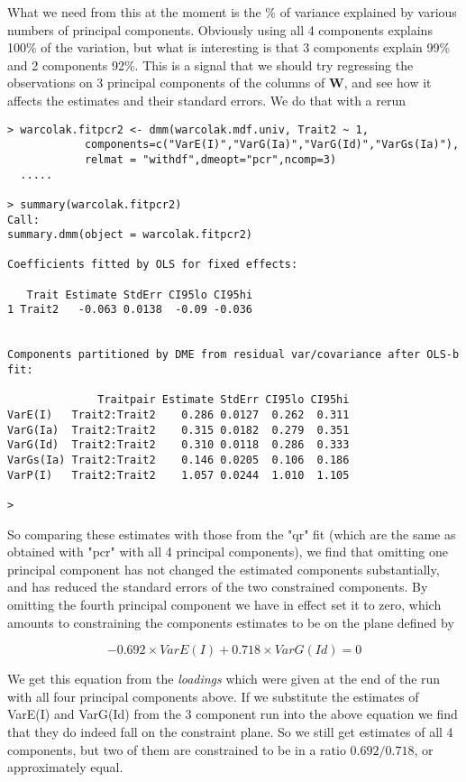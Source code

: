 \documentclass[titlepage]{article}  %
\begin{document}
What we need from this at the moment is the \% of variance explained by various numbers of principal components. Obviously using all 4 components explains 100\% of the variation, but what is interesting is that  3 components explain 99\% and 2 components 92\%. This is a signal that we should try regressing the observations on 3 principal components of the columns of $\bm{W}$, and see how it affects the estimates and their standard errors. We do that with a rerun

\begin{verbatim}
> warcolak.fitpcr2 <- dmm(warcolak.mdf.univ, Trait2 ~ 1,
            components=c("VarE(I)","VarG(Ia)","VarG(Id)","VarGs(Ia)"),
            relmat = "withdf",dmeopt="pcr",ncomp=3)
  .....

> summary(warcolak.fitpcr2)
Call:
summary.dmm(object = warcolak.fitpcr2)

Coefficients fitted by OLS for fixed effects:

   Trait Estimate StdErr CI95lo CI95hi
1 Trait2   -0.063 0.0138  -0.09 -0.036


Components partitioned by DME from residual var/covariance after OLS-b fit:

              Traitpair Estimate StdErr CI95lo CI95hi
VarE(I)   Trait2:Trait2    0.286 0.0127  0.262  0.311
VarG(Ia)  Trait2:Trait2    0.315 0.0182  0.279  0.351
VarG(Id)  Trait2:Trait2    0.310 0.0118  0.286  0.333
VarGs(Ia) Trait2:Trait2    0.146 0.0205  0.106  0.186
VarP(I)   Trait2:Trait2    1.057 0.0244  1.010  1.105

> 
\end{verbatim}

So comparing these estimates with those from the "qr" fit (which are the same as obtained with "pcr" with all 4 principal components), we find that omitting one principal component has not changed the estimated components substantially, and has reduced the standard errors of the two constrained components.  By omitting the fourth principal component we have in effect set it to zero, which amounts to constraining the components estimates to be on the plane defined by

\begin{equation}
  -0.692 \times VarE(I) + 0.718 \times VarG(Id) = 0
\end{equation}

We get this equation from the {\em loadings} which were given at the end of the run with all four principal components above. If we substitute the estimates of VarE(I) and VarG(Id) from the 3 component run into the above equation we find that they do indeed fall on the constraint plane. So we still get estimates of all 4 components, but two of them are constrained to be in a ratio $0.692/0.718$, or approximately equal. 
\end{document}
